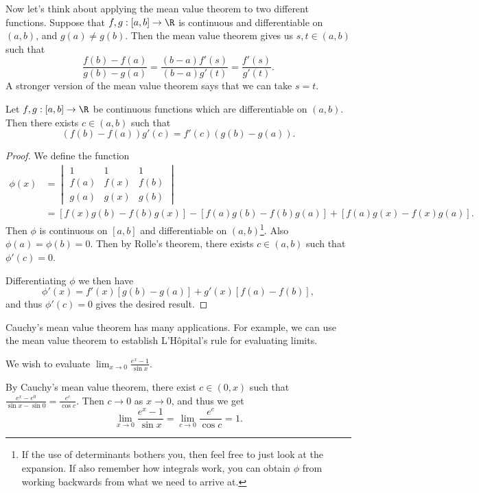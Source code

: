 Now let's think about applying the mean value theorem to two different functions. Suppose that $f, g : [a, b] \rightarrow \R$ is continuous and differentiable on $(a, b)$, and $g(a) \neq g(b)$. Then the mean value theorem gives us $s, t \in (a, b)$ such that
$$
	\frac{f(b) - f(a)}{g(b) - g(a)} = \frac{(b - a)f'(s)}{(b - a)g'(t)} = \frac{f'(s)}{g'(t)}.
$$
A stronger version of the mean value theorem says that we can take $s = t$.

\begin{theorem}
	Let $f, g : [a, b] \rightarrow \R$ be continuous functions which are differentiable on $(a, b)$. Then there exists $c \in (a, b)$ such that
	$$
	(f(b) - f(a))g'(c) = f'(c)(g(b) - g(a)).
	$$
\end{theorem}
\begin{proof}
	We define the function
	\begin{align*}
		\phi(x) &= \begin{vmatrix}
			1 & 1 & 1 \\
			f(a) & f(x) & f(b) \\
			g(a) & g(x) & g(b)
			\end{vmatrix}  \\
		&= \left[f(x)g(b) - f(b)g(x)\right] - [f(a)g(b) - f(b) g(a)] + [f(a) g(x) - f(x) g(a)].
	\end{align*}
	Then $\phi$ is continuous on $[a, b]$ and differentiable on $(a, b)$\footnote{If the use of determinants bothers you, then feel free to just look at the expansion. If also remember how integrals work, you can obtain $\phi$ from working backwards from what we need to arrive at.}. Also $\phi(a) =\phi(b) = 0$. Then by Rolle's theorem, there exists $c \in (a, b)$ such that $\phi'(c) = 0$.
	
	Differentiating $\phi$ we then have 
	$$
	\phi'(x) = f'(x)[g(b) - g(a)] + g'(x)[f(a) - f(b)],
	$$
	and thus $\phi'(c) = 0$ gives the desired result.
\end{proof}

Cauchy's mean value theorem has many applications. For example, we can use the mean value theorem to establish L'Hôpital's rule for evaluating limits.

\begin{example}
	We wish to evaluate $\displaystyle \lim_{x \to 0} \frac{e^x - 1}{\sin x}$.

	By Cauchy's mean value theorem, there exist $c \in (0, x)$ such that
	$
	\frac{e^x - e^0}{\sin x - \sin 0} = \frac{e^c}{\cos c}.
	$
	Then $c \rightarrow 0$ as $x \rightarrow 0$, and thus we get
	$$
	\lim_{x \to 0} \frac{e^x - 1}{\sin x} = \lim_{c \to 0}\frac{e^c}{\cos c} = 1.
	$$
\end{example}

